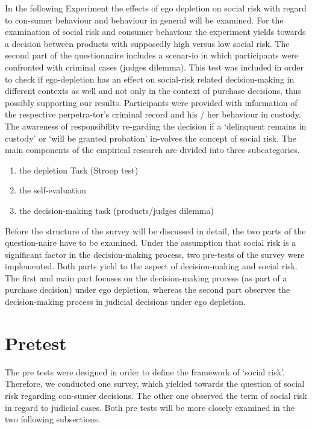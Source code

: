In the following Experiment the effects of ego depletion on social risk with regard to con-sumer behaviour and behaviour in general will be examined. For the examination of social risk and consumer behaviour the experiment yields towards a decision between products with supposedly high versus low social risk. The second part of the questionnaire includes a scenar-io in which participants were confronted with criminal cases (judges dilemma). This test was included in order to check if ego-depletion has an effect on social-risk related decision-making in different contexts as well and not only in the context of purchase decisions, thus possibly supporting our results. Participants were provided with information of the respective perpetra-tor’s criminal record and his / her behaviour in custody. The awareness of responsibility re-garding the decision if a ‘delinquent remains in custody’ or ‘will be granted probation’ in-volves the concept of social risk.
The main components of the empirical research are divided into three subcategories. 
\begin{enumerate}[1.]
\item the depletion Task (Stroop test)
\item the self-evaluation 
\item the decision-making task (products/judges dilemma)
\end{enumerate}
Before the structure of the survey will be discussed in detail, the two parts of the question-naire have to be examined. Under the assumption that social risk is a significant factor in the decision-making process, two pre-tests of the survey were implemented. Both parts yield to the aspect of decision-making and social risk. The first and main part focuses on the decision-making process (as part of a purchase decision) under ego depletion, whereas the second part observes the decision-making process in judicial decisions under ego depletion.  

\section{Pretest}
The pre tests were designed in order to define the framework of ‘social risk’. Therefore, we conducted one survey, which yielded towards the question of social risk regarding con-sumer decisions. The other one observed the term of social risk in regard to judicial cases. Both pre tests will be more closely examined in the two following subsections.
